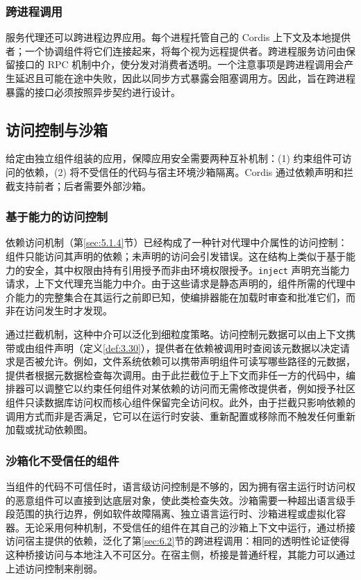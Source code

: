 \subsubsection{跨进程调用}

服务代理还可以跨进程边界应用\cite{ref53}。每个进程托管自己的 Cordis 上下文及本地提供者；一个协调组件将它们连接起来，将每个视为远程提供者。跨进程服务访问由保留接口的 RPC 机制中介，使分发对消费者透明。一个注意事项是跨进程调用会产生延迟且可能在途中失败，因此以同步方式暴露会阻塞调用方。因此，旨在跨进程暴露的接口必须按照异步契约进行设计。

\subsection{访问控制与沙箱}\label{sec:6.3}

给定由独立组件组装的应用，保障应用安全需要两种互补机制：(1) 约束组件可访问的依赖，(2) 将不受信任的代码与宿主环境沙箱隔离。Cordis 通过依赖声明和拦截支持前者；后者需要外部沙箱。

\subsubsection{基于能力的访问控制}

依赖访问机制（第\ref{sec:5.1.4}节）已经构成了一种针对代理中介属性的访问控制：组件只能访问其声明的依赖；未声明的访问会引发错误。这在结构上类似于基于能力的安全\cite{ref54,ref55,ref56}，其中权限由持有引用授予而非由环境权限授予。\texttt{inject} 声明充当能力请求，上下文代理充当能力中介。由于这些请求是静态声明的，组件所需的代理中介能力的完整集合在其运行之前即已知，使编排器能在加载时审查和批准它们，而非在访问发生时才发现。

通过拦截机制，这种中介可以泛化到细粒度策略。访问控制元数据可以由上下文携带或由组件声明（定义\ref{def:3.30}），提供者在依赖被调用时查阅该元数据以决定请求是否被允许。例如，文件系统依赖可以携带声明组件可读写哪些路径的元数据，提供者根据元数据检查每次调用。由于此拦截位于上下文而非任一方的代码中，编排器可以调整它以约束任何组件对某依赖的访问而无需修改提供者，例如授予社区组件只读数据库访问权而核心组件保留完全访问权。此外，由于拦截只影响依赖的调用方式而非是否满足，它可以在运行时安装、重新配置或移除而不触发任何重新加载或扰动依赖图。

\subsubsection{沙箱化不受信任的组件}

当组件的代码不可信任时，语言级访问控制是不够的，因为拥有宿主运行时访问权的恶意组件可以直接到达底层对象，使此类检查失效。沙箱需要一种超出语言级手段范围的执行边界，例如软件故障隔离\cite{ref57}、独立语言运行时、沙箱进程或虚拟化容器\cite{ref58}。无论采用何种机制，不受信任的组件在其自己的沙箱上下文中运行，通过桥接访问宿主提供的依赖，泛化了第\ref{sec:6.2}节的跨进程调用：相同的透明性论证使得这种桥接访问与本地注入不可区分。在宿主侧，桥接是普通纤程，其能力可以通过上述访问控制来削弱。

